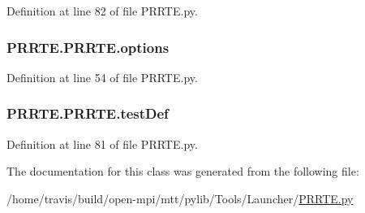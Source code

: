 Definition at line 82 of file P\-R\-R\-T\-E.\-py.

\hypertarget{class_p_r_r_t_e_1_1_p_r_r_t_e_a174321352f6234d4704b9a980574bdc7}{
\subsubsection[{options}]{\setlength{\rightskip}{0pt plus 5cm}P\-R\-R\-T\-E.\-P\-R\-R\-T\-E.\-options}}\label{class_p_r_r_t_e_1_1_p_r_r_t_e_a174321352f6234d4704b9a980574bdc7}


Definition at line 54 of file P\-R\-R\-T\-E.\-py.

\hypertarget{class_p_r_r_t_e_1_1_p_r_r_t_e_a797f27c656051565b7897358a7c28a40}{
\subsubsection[{test\-Def}]{\setlength{\rightskip}{0pt plus 5cm}P\-R\-R\-T\-E.\-P\-R\-R\-T\-E.\-test\-Def}}\label{class_p_r_r_t_e_1_1_p_r_r_t_e_a797f27c656051565b7897358a7c28a40}


Definition at line 81 of file P\-R\-R\-T\-E.\-py.



The documentation for this class was generated from the following file\-:\begin{DoxyCompactItemize}
\item 
/home/travis/build/open-\/mpi/mtt/pylib/\-Tools/\-Launcher/\hyperlink{_p_r_r_t_e_8py}{P\-R\-R\-T\-E.\-py}\end{DoxyCompactItemize}
